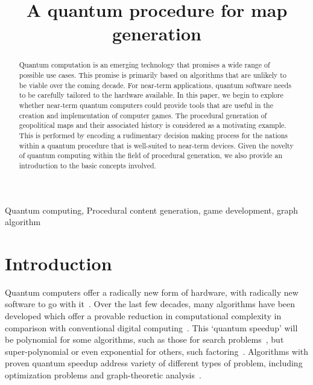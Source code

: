 \documentclass[conference]{IEEEtran}
\begin{document}
\title{A quantum procedure for map generation}



\author{
}

\maketitle

\begin{abstract}

Quantum computation is an emerging technology that promises a wide range of possible use cases. This promise is primarily based on algorithms that are unlikely to be viable over the coming decade. For near-term applications, quantum software needs to be carefully tailored to the hardware available. In this paper, we begin to explore whether near-term quantum computers could provide tools that are useful in the creation and implementation of computer games. The procedural generation of geopolitical maps and their associated history is considered as a motivating example. This is performed by encoding a rudimentary decision making process for the nations within a quantum procedure that is well-suited to near-term devices. Given the novelty of quantum computing within the field of procedural generation, we also provide an introduction to the basic concepts involved.

\end{abstract}

\begin{IEEEkeywords}
Quantum computing, Procedural content generation, game development, graph algorithm
\end{IEEEkeywords}

\section{Introduction}

Quantum computers offer a radically new form of hardware, with radically new software to go with it~\cite{benioff,feynman,ike-mike}. Over the last few decades, many algorithms have been developed which offer a provable reduction in computational complexity in comparison with conventional digital computing~\cite{deutsch,montanaro}. This `quantum speedup' will be polynomial for some algorithms, such as those for search problems~\cite{grover}, but super-polynomial or even exponential for others, such factoring~\cite{shor}. Algorithms with proven quantum speedup address variety of different types of problem, including optimization problems and graph-theoretic analysis~\cite{algorithm-zoo,qiskit-textbook}.
\end{document}
